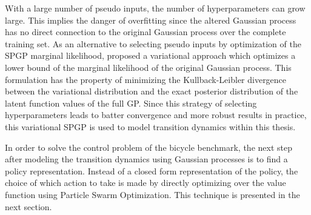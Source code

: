 With a large number of pseudo inputs, the number of hyperparameters can grow large.
This implies the danger of overfitting since the altered Gaussian process has no direct connection to the original Gaussian process over the complete training set.
As an alternative to selecting pseudo inputs by optimization of the SPGP marginal likelihood, \citeauthor{titsias_variational_2009} proposed a variational approach \cite{titsias_variational_2009} which optimizes a lower bound of the marginal likelihood of the original Gaussian process.
This formulation has the property of minimizing the Kullback-Leibler divergence between the variational distribution and the exact posterior distribution of the latent function values of the full GP.
Since this strategy of selecting hyperparameters leads to batter convergence and more robust results in practice, this variational SPGP is used to model transition dynamics within this thesis.

In order to solve the control problem of the bicycle benchmark, the next step after modeling the transition dynamics using Gaussian processes is to find a policy representation.
Instead of a closed form representation of the policy, the choice of which action to take is made by directly optimizing over the value function using Particle Swarm Optimization.
This technique is presented in the next section.
